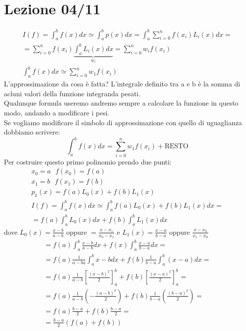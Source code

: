 \documentclass[a4paper, portrait]{book}
\numberwithin{equation}{chapter} %
\begin{document}
\chapter{Lezione 04/11}
\begin{gather}
    I(f) = \int_a^b f(x) dx \simeq \int_a^b p(x) dx = \int_a^b \sum_{i=0}^{n}f(x_i)L_i(x)dx = \\
    = \sum_{i=0}^n f(x_i)\underbrace{\int_a^b L_i(x)dx}_{w_i} = \sum_{i=0}^n w_i f(x_i)\\
    \int_a^b f(x) dx \simeq \sum_{i=0}^n w_1 f(x_i)
\end{gather}
L'approssimazione da cosa è fatta? L'integrale definito tra a e b è la somma di acluni valori della funzione integranda pesati.\\
Qualunque formula useremo andremo sempre a calcolare la funzione in questo modo, andando a modificare i pesi.\\
Se vogliamo modificare il simbolo di approssimazione con quello di uguaglianza dobbiamo scrivere:
\begin{equation}
    \int_a^b f(x) dx = \sum_{i=0}^n w_1 f(x_i) + \text{RESTO}
\end{equation}
Per costruire questo primo polinomio prendo due punti:
\begin{gather}
    x_0 = a \ \ \ f(x_0)=f(a)\\
    x_1 = b \ \ \ f(x_1) = f(b)\\
    p_1 (x) = f(a) L_0(x) + f(b) L_1(x)\\
    I(f) = \int_a^b f(x) dx \simeq \int_a^b f(a) L_0(x) + f(b) L_1(x) dx = \\
    = f(a) \int_a^b L_0(x) dx + f(b) \int_a^b L_1(x) dx
\end{gather}
dove $L_0(x) = \frac{x-b}{a-b}$ oppure $= \frac{x-x_1}{x_0-x_1}$ e $L_1(x) = \frac{x-a}{b-a}$ oppure $\frac{x-x_0}{x_1-x_0}$
\begin{gather}
    = f(a) \int_a^b \frac{x-b}{a-b} dx + f(x) \int_a^b \frac{x-a}{b-a}dx = \\
    = f(a) \frac{1}{a-ba} \int_a^b x-b dx + f(b) \frac{1}{b-a}\int_a^b (x-a) dx =\\
    = f(a) \frac{1}{a-b}\left[\frac{(x-b)^2}{2}\right]^b_a + f(b) \left[\frac{(x-a)^2}{2}\right]_a^b = \\
    = f(a) \frac{1}{a-b}\left(-\frac{(a-b)^2}{2}\right) + f(b) \frac{1}{b-a} \left(\frac{(b-a)^2}{2}\right) = \\
    = f(a) \frac{b-a}{2} + f(b) \frac{b-a}{2} = \\
    = \frac{b-a}{2}(f(a)+f(b))
\end{gather}
\end{document}
